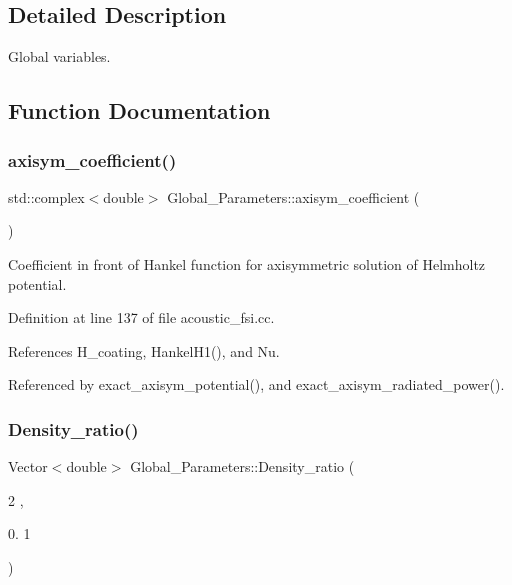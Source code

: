 \subsection{Detailed Description}
Global variables. 

\subsection{Function Documentation}
\mbox{\label{namespaceGlobal__Parameters_a12dd327bc592b36ffd4abbab5018146f}} 
\subsubsection{\texorpdfstring{axisym\+\_\+coefficient()}{axisym\_coefficient()}}
{\footnotesize\ttfamily std\+::complex$<$double$>$ Global\+\_\+\+Parameters\+::axisym\+\_\+coefficient (\begin{DoxyParamCaption}{ }\end{DoxyParamCaption})}



Coefficient in front of Hankel function for axisymmetric solution of Helmholtz potential. 



Definition at line 137 of file acoustic\+\_\+fsi.\+cc.



References H\+\_\+coating, Hankel\+H1(), and Nu.



Referenced by exact\+\_\+axisym\+\_\+potential(), and exact\+\_\+axisym\+\_\+radiated\+\_\+power().

\mbox{\label{namespaceGlobal__Parameters_a3ad42a80620a3847cf0d1b187e2ed2ec}} 
\subsubsection{\texorpdfstring{Density\+\_\+ratio()}{Density\_ratio()}}
{\footnotesize\ttfamily Vector$<$double$>$ Global\+\_\+\+Parameters\+::\+Density\+\_\+ratio (\begin{DoxyParamCaption}\item[{2}]{,  }\item[{0.}]{1 }\end{DoxyParamCaption})}



